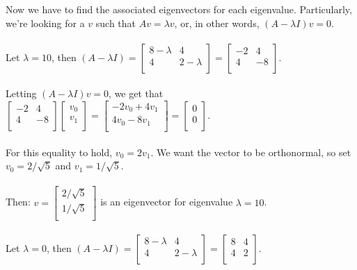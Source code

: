 \documentclass[11pt]{article}
\begin{document}
Now we have to find the associated eigenvectors for each eigenvalue. Particularly, we're looking for a $v$ such that $Av = \lambda v$, or, in other words, $(A - \lambda I)v = 0$. \\\\
Let $\lambda = 10$, then $(A - \lambda I) = \begin{bmatrix}
8 - \lambda & 4 \\
4 & 2 - \lambda \\
\end{bmatrix} = \begin{bmatrix}
-2 & 4 \\
4 & -8 \\
\end{bmatrix}$. \\\\
Letting $(A - \lambda I)v = 0$, we get that $ \begin{bmatrix}
-2 & 4 \\
4 & -8 \\
\end{bmatrix} \begin{bmatrix}
v_0 \\
v_1 \\
\end{bmatrix} = \begin{bmatrix}
-2v_0 + 4v_1 \\
4v_0 - 8v_1 \\
\end{bmatrix} = \begin{bmatrix}
0 \\
0 \\
\end{bmatrix} $. \\\\
For this equality to hold, $v_0 = 2v_1$. We want the vector to be orthonormal, so set $v_0 = 2 / \sqrt5$ and $v_1 = 1 / \sqrt5.$ \\\\
Then: $v = \begin{bmatrix}
2 / \sqrt5 \\
1 / \sqrt5 \\
\end{bmatrix}$ is an eigenvector for eigenvalue $\lambda = 10$. \\\\
Let $\lambda = 0$, then $(A - \lambda I) = \begin{bmatrix}
8 - \lambda & 4 \\
4 & 2 - \lambda \\
\end{bmatrix} = \begin{bmatrix}
8 & 4 \\
4 & 2 \\
\end{bmatrix}$. \\\\
\end{document}

